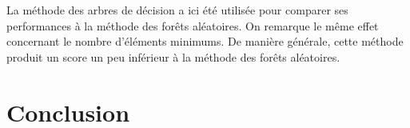 \documentclass[11pt, a4paper]{article}
\begin{document}
La méthode des arbres de décision a ici été utilisée pour comparer ses performances à la méthode des forêts aléatoires.
On remarque le même effet concernant le nombre d'éléments minimums.
De manière générale, cette méthode produit un score un peu inférieur à la méthode des forêts aléatoires.

\newpage

\section{Conclusion}
\end{document}
